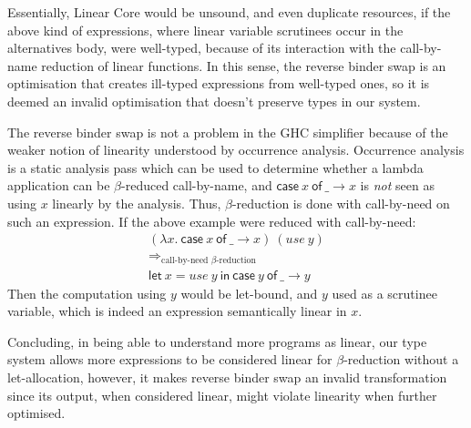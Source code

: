 \documentclass[acmsmall, screen, review]{acmart}
\newcommand{\llet}[2]{\mathsf{let}~#1~\mathsf{in}~#2}
\newcommand{\ccase}[2]{\mathsf{case}~#1~\mathsf{of}~#2}
\begin{document}
Essentially, Linear Core would be unsound, and even duplicate resources, if the
above kind of expressions, where linear variable scrutinees occur in the
alternatives body, were well-typed, because of its interaction with the
call-by-name reduction of linear functions. In this sense, the reverse binder
swap is an optimisation that creates ill-typed expressions from well-typed
ones, so it is deemed an invalid optimisation that doesn't preserve types in
our system.

The reverse binder swap is not a problem in the GHC simplifier because of the
weaker notion of linearity understood by occurrence analysis. Occurrence
analysis is a static analysis pass which can be used to determine whether a
lambda application can be $\beta$-reduced call-by-name, and $\ccase{x}{\_ \to
x}$ is \emph{not} seen as using $x$ linearly by the analysis. Thus,
$\beta$-reduction is done with call-by-need on such an expression. If the above
example were reduced with call-by-need:
\[
\begin{array}{l}
(\lambda x.~\ccase{x}{\_ \to x})~(use~y)\\
\Longrightarrow_\textrm{call-by-need $\beta$-reduction}\\
\llet{x = use~y}{\ccase{y}{\_ \to y}}
\end{array}
\]
Then the computation using $y$ would be let-bound, and $y$ used as a scrutinee
variable, which is indeed an expression semantically linear in $x$.

Concluding, in being able to understand more programs as linear, our type
system allows more expressions to be considered linear for $\beta$-reduction
without a let-allocation, however, it makes reverse binder swap an invalid
transformation since its output, when considered linear, might violate
linearity when further optimised.

% 
\end{document}
